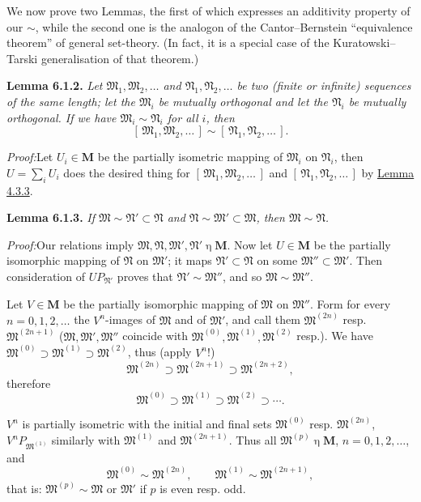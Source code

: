 \documentclass[12pt,b5paper,twoside]{article}
\newcommand{\M}{\mathbf M}
\newcommand{\clos}[1]{[\,#1\,]}
\newcommand{\Lemma}[1]{%
  \par\smallskip\noindent\phantomsection\label{lem:#1}\textbf{Lemma #1.}\enspace
}
\newcommand{\Proof}{\par\noindent\textit{Proof:}\enspace}
\newcommand{\lemref}[1]{\hyperref[lem:#1]{Lemma #1}}
\begin{document}
We now prove two Lemmas, the first of which expresses an additivity property
of our \(\sim\), while the second one is the analogon of the Cantor--Bernstein
``equivalence theorem'' of general set-theory. (In fact, it is a special case
of the Kuratowski--Tarski generalisation of that theorem.)

\Lemma{6.1.2} {\itshape
Let \(\mathfrak M_1,\mathfrak M_2,\ldots\) and
\(\mathfrak N_1,\mathfrak N_2,\ldots\) be two (finite or infinite) sequences
of the same length; let the \(\mathfrak M_i\) be mutually orthogonal and let
the \(\mathfrak N_i\) be mutually orthogonal. If we have
\(\mathfrak M_i\sim\mathfrak N_i\) for all \(i\), then
\[
  \clos{\mathfrak M_1,\mathfrak M_2,\ldots}
  \sim
  \clos{\mathfrak N_1,\mathfrak N_2,\ldots}.
\]
}

\Proof Let \(U_i\in\M\) be the partially isometric mapping of
\(\mathfrak M_i\) on \(\mathfrak N_i\), then \(U=\sum_iU_i\) does the
desired thing for \(\clos{\mathfrak M_1,\mathfrak M_2,\ldots}\) and
\(\clos{\mathfrak N_1,\mathfrak N_2,\ldots}\) by \lemref{4.3.3}.

\Lemma{6.1.3} {\itshape
If \(\mathfrak M\sim\mathfrak N'\subset\mathfrak N\) and
\(\mathfrak N\sim\mathfrak M'\subset\mathfrak M\), then
\(\mathfrak M\sim\mathfrak N\).
}

\Proof Our relations imply
\(\mathfrak M,\mathfrak N,\mathfrak M',\mathfrak N'\mathbin{\eta}\M\).
Now let \(U\in\M\) be the partially isomorphic mapping of \(\mathfrak N\)
on \(\mathfrak M'\); it maps \(\mathfrak N'\subset\mathfrak N\) on some
\(\mathfrak M''\subset\mathfrak M'\). Then consideration of
\(UP_{\mathfrak N'}\) proves that \(\mathfrak N'\sim\mathfrak M''\), and
so \(\mathfrak M\sim\mathfrak M''\).

Let \(V\in\M\) be the partially isomorphic mapping of \(\mathfrak M\) on
\(\mathfrak M''\). Form for every \(n=0,1,2,\ldots\) the \(V^n\)-images
of \(\mathfrak M\) and of \(\mathfrak M'\), and call them
\(\mathfrak M^{(2n)}\) resp. \(\mathfrak M^{(2n+1)}\)
(\(\mathfrak M,\mathfrak M',\mathfrak M''\) coincide with
\(\mathfrak M^{(0)},\mathfrak M^{(1)},\mathfrak M^{(2)}\) resp.). We have
\(\mathfrak M^{(0)}\supset\mathfrak M^{(1)}\supset\mathfrak M^{(2)}\),
thus (apply \(V^n\)!)
\[
 \mathfrak M^{(2n)}\supset\mathfrak M^{(2n+1)}
 \supset\mathfrak M^{(2n+2)},
\]
therefore
\[
 \mathfrak M^{(0)}\supset\mathfrak M^{(1)}\supset
 \mathfrak M^{(2)}\supset\cdots.
\]

\(V^n\) is partially isometric with the initial and final sets
\(\mathfrak M^{(0)}\) resp. \(\mathfrak M^{(2n)}\),
\(V^nP_{\mathfrak M^{(1)}}\) similarly with \(\mathfrak M^{(1)}\) and
\(\mathfrak M^{(2n+1)}\). Thus all
\(\mathfrak M^{(p)}\mathbin{\eta}\M\), \(n=0,1,2,\ldots\), and
\[
 \mathfrak M^{(0)}\sim\mathfrak M^{(2n)},\qquad
 \mathfrak M^{(1)}\sim\mathfrak M^{(2n+1)},
\]
that is: \(\mathfrak M^{(p)}\sim\mathfrak M\) or \(\mathfrak M'\) if
\(p\) is even resp. odd.
\end{document}
